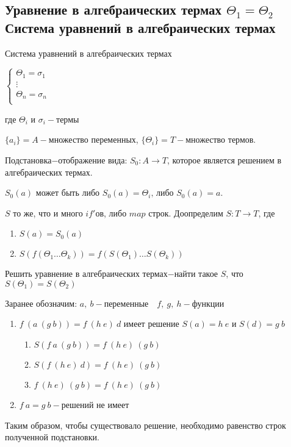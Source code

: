 	\subsection{Уравнение в алгебраических термах $\Theta_1=\Theta_2$\\Система уравнений в алгебраических термах}
	\begin{definition}Система уравнений в алгебраических термах\end{definition}
	$
		\begin{cases}
			\Theta_1=\sigma_1&\\
			\vdots&\\
			\Theta_n=\sigma_n&\\
		\end{cases}
	$\par где $\Theta_i \text{ и } \sigma_i-\text{термы}$\par
	\begin{definition}$\{a_i\}=A-$множество переменных, $\{\Theta_i\}=T-$множество термов.\end{definition}
	\begin{definition}Подстановка$-$отображение вида: $S_0:A\to T$, которое является решением в алгебраических термах.\par $S_0(a)$ может быть либо $S_0(a)=\Theta_i\text{, либо }S_0(a)=a$.\end{definition} 
	$S$ то же, что и много $if'$ов, либо $map$ строк. Доопределим $S:T\to T$, где \begin{enumerate}
		\item $S(a)=S_0(a)$
		\item $S(f(\Theta_1 \ldots \Theta_k))=f(S(\Theta_1) \ldots S(\Theta_k))$
	\end{enumerate}
	
	\begin{definition}Решить уравнение в алгебраических термах$-$найти такое $S$, что $S(\Theta_1)=S(\Theta_2)$\end{definition} 

	\begin{example}\end{example}
		Заранее обозначим: $a,\:b-\text{переменные}\hspace{1em} f,\:g,\:h-\text{функции}$
		\begin{enumerate}
			\item $f\:(a\:(g\:b))=f\:(h\:e)\:d$ имеет решение $S(a)=h\:e\text{ и }S(d)=g\:b$
				\begin{enumerate}
					\item $S(f\:a\:(g\:b))=f\:(h\:e)\:(g\:b)$
					\item $S(f\:(h\:e)\:d)=f\:(h\:e)\:(g\:b)$
					\item $f\:(h\:e)\:(g\:b)=f\:(h\:e)\:(g\:b)$
				\end{enumerate}
			\item $f\:a=g\:b-$решений не имеет
		\end{enumerate}
		Таким образом, чтобы существовало решение, необходимо равенство строк полученной подстановки.\par
